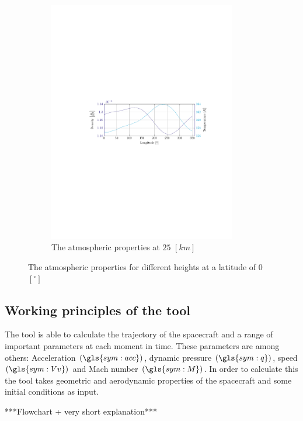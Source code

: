 \begin{figure}[h]
\begin{subfigure}{0.9\textwidth}
	\includegraphics[trim={4.5cm 11cm 3.1cm 11cm},clip,width=0.9\textwidth]{Figure/atmos_model/lon_25.pdf}
	\caption{The atmospheric properties at $25$ $\left[km\right]$} 
	\label{fig:atmos_lon_25}
	\end{subfigure}
	\caption{The atmospheric properties for different heights at a latitude of 0 $\left[^\circ\right]$}
	\label{fig:atmos_lon}
\end{figure}

\subsection{Working principles of the tool}
\label{sec:astrowp}
The tool is able to calculate the trajectory of the spacecraft and a range of important parameters at each moment in time. These parameters are among others: Acceleration $\left(\gls{sym:acc}\right)$, dynamic pressure $\left(\gls{sym:q}\right)$, speed $\left(\gls{sym:Vv}\right)$ and Mach number $\left(\gls{sym:M}\right)$. In order to calculate this the tool takes geometric and aerodynamic properties of the spacecraft and some initial conditions as input.

***Flowchart + very short explanation***\\

